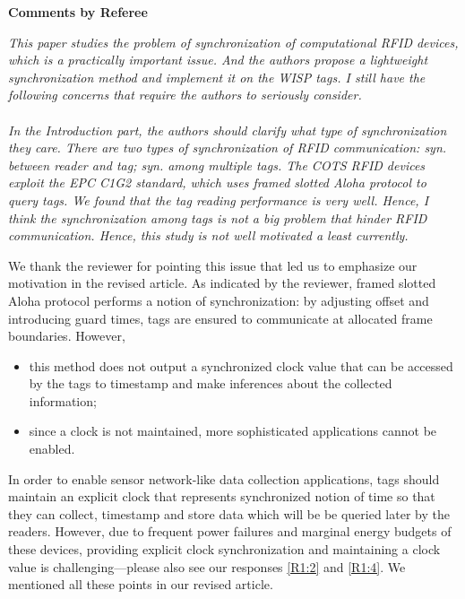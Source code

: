 \documentclass[10pt]{article}
\newcommand{\referee}[1]{
	{\item \color{OliveGreen} \emph{{#1}}}
	\label{R\therefereeCounter:\arabic{enumi}}
}
\newcommand{\response}[1]{{\color{blue} #1}}
\newcounter{refereeCounter}
\newenvironment{responses}{%
\refstepcounter{refereeCounter}%
\textbf{\large Comments by Referee \therefereeCounter}
\begin{enumerate}%
\renewcommand{\labelenumi}{\textbf{[R\therefereeCounter :\,\arabic{enumi}]}} %
}{\end{enumerate}}
\begin{document}
\begin{responses}
 
\referee{This paper studies the problem of synchronization of computational RFID devices, which is a practically important issue. And the authors propose a lightweight synchronization method and implement it on the WISP tags. I still have the following concerns that require the authors to seriously consider. \\
\\	
In the Introduction part, the authors should clarify what type of synchronization they care. There are two types of synchronization of RFID communication: syn. between reader and tag; syn. among multiple tags. The COTS RFID devices exploit the EPC C1G2 standard, which uses framed slotted Aloha protocol to query tags. We found that the tag reading performance is very well. Hence, I think the synchronization among tags is not a big problem that hinder RFID communication. Hence, this study is not well motivated a least currently.}

\response{
We thank the reviewer for pointing this issue that led us to emphasize our motivation in the revised article. As indicated by the reviewer, framed slotted Aloha protocol performs a notion of synchronization: by adjusting offset and introducing guard times, tags are ensured to communicate at allocated frame boundaries. However, 
\begin{itemize}
	\item this method does not output a synchronized clock value that can be accessed by the tags to timestamp and make inferences about the collected information;
	\item since a clock is not maintained, more sophisticated applications cannot be enabled.
\end{itemize}

In order to enable sensor network-like data collection applications, tags should maintain an explicit clock that represents synchronized notion of time so that they can  collect, timestamp and store data which will be be queried later by the readers. However, due to frequent power failures and marginal energy budgets of these devices, providing explicit clock synchronization and maintaining a clock value is challenging---please also see our responses \hyperref[R1:2]{[R1:2]} and \hyperref[R1:4]{[R1:4]}. We mentioned all these points in our revised article.
}


\end{responses}
\end{document}
